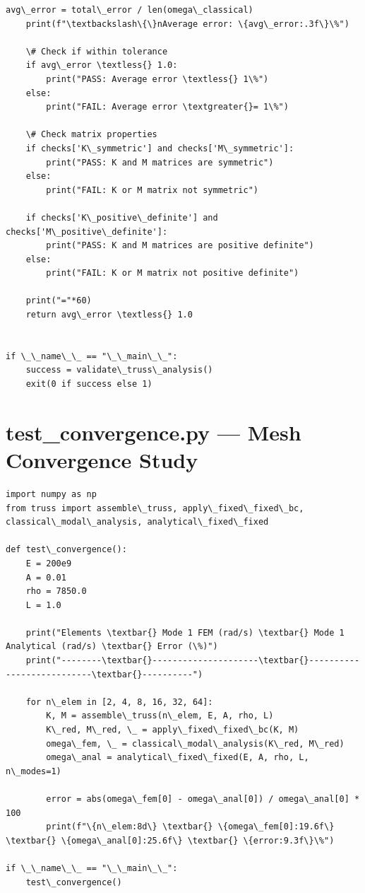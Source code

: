\documentclass[12pt, a4paper]{article}
\begin{document}
\begin{lstlisting}[style=codestyle, caption={{validate_truss.py --- Truss FEA Validation}}]
    avg\_error = total\_error / len(omega\_classical)
    print(f"\textbackslash\{\}nAverage error: \{avg\_error:.3f\}\%")
    
    \# Check if within tolerance
    if avg\_error \textless{} 1.0:
        print("PASS: Average error \textless{} 1\%")
    else:
        print("FAIL: Average error \textgreater{}= 1\%")
    
    \# Check matrix properties
    if checks['K\_symmetric'] and checks['M\_symmetric']:
        print("PASS: K and M matrices are symmetric")
    else:
        print("FAIL: K or M matrix not symmetric")
        
    if checks['K\_positive\_definite'] and checks['M\_positive\_definite']:
        print("PASS: K and M matrices are positive definite")
    else:
        print("FAIL: K or M matrix not positive definite")
        
    print("="*60)
    return avg\_error \textless{} 1.0


if \_\_name\_\_ == "\_\_main\_\_":
    success = validate\_truss\_analysis()
    exit(0 if success else 1)
\end{lstlisting}

\section{test_convergence.py --- Mesh Convergence Study}
\begin{lstlisting}[style=codestyle, caption={{test_convergence.py --- Mesh Convergence Study}}]
import numpy as np
from truss import assemble\_truss, apply\_fixed\_fixed\_bc, classical\_modal\_analysis, analytical\_fixed\_fixed

def test\_convergence():
    E = 200e9
    A = 0.01
    rho = 7850.0
    L = 1.0
    
    print("Elements \textbar{} Mode 1 FEM (rad/s) \textbar{} Mode 1 Analytical (rad/s) \textbar{} Error (\%)")
    print("--------\textbar{}---------------------\textbar{}---------------------------\textbar{}----------")
    
    for n\_elem in [2, 4, 8, 16, 32, 64]:
        K, M = assemble\_truss(n\_elem, E, A, rho, L)
        K\_red, M\_red, \_ = apply\_fixed\_fixed\_bc(K, M)
        omega\_fem, \_ = classical\_modal\_analysis(K\_red, M\_red)
        omega\_anal = analytical\_fixed\_fixed(E, A, rho, L, n\_modes=1)
        
        error = abs(omega\_fem[0] - omega\_anal[0]) / omega\_anal[0] * 100
        print(f"\{n\_elem:8d\} \textbar{} \{omega\_fem[0]:19.6f\} \textbar{} \{omega\_anal[0]:25.6f\} \textbar{} \{error:9.3f\}\%")

if \_\_name\_\_ == "\_\_main\_\_":
    test\_convergence()
\end{lstlisting}
\end{document}
